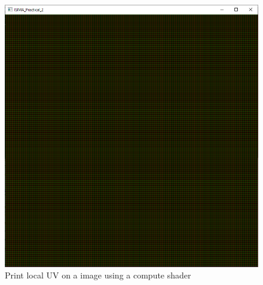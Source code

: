 \documentclass{article}
\begin{document}
\begin{figure}[h]
	\centering
	\includegraphics[scale=0.4]{images/local_uv.png}
	\caption{Print local UV on a image using a compute shader}
\end{figure}
\end{document}

